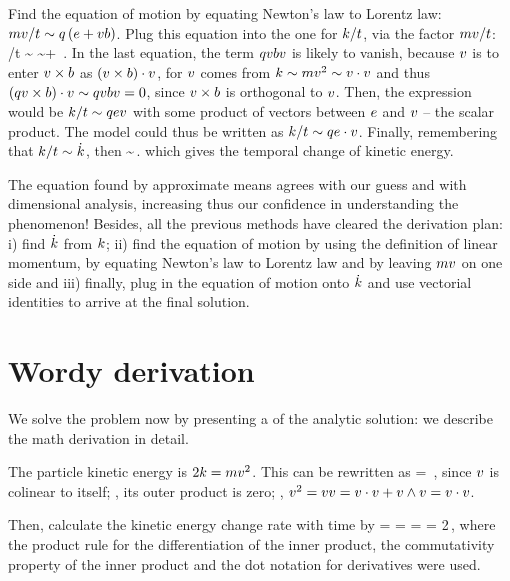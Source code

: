 Find the equation of motion by equating Newton's law to Lorentz law: $mv/t\sim q\left({e + vb}\right)$. Plug this equation into the one for $k/t$, via the factor $mv/t$:
%
\beq
  \ekin/t \sim \echarge\parth{\efield + \vel\mfield}\vel 
          \sim \echarge\efield\vel + \echarge\vel\mfield\vel\,.
\eeq
%
In the last equation, the term $qvbv$ is likely to vanish, because $v$ is to enter $v\times b$ as $\left({v\times b}\right)\cdot v$, for $v$ comes from $k\sim mv^2\sim v\cdot v$ and thus
$\left({qv\times b}\right)\cdot v\sim qvbv = 0$, since $v\times b$ is orthogonal to $v$. Then, the expression would be $k/t\sim qev$ with some product of vectors between $e$ and $v$ -- the scalar product. The model could thus be written as $k/t\sim qe\cdot v$. Finally, remembering that $k/t\sim\dot{k}$, then
%
\beq
  \dt\ekin\sim\echarge\efield\iprod\vel\,.
\eeq
%
which gives the temporal change of kinetic energy.

The equation found by approximate means agrees with our guess and with dimensional analysis, increasing thus our confidence in understanding the phenomenon! Besides, all the previous methods have cleared the derivation plan: i) find $\dot{k}$ from $k$; ii) find the equation of motion by using the definition of linear momentum, by equating Newton's law to Lorentz law and by leaving $mv$ on one side and iii) finally, plug in the equation of motion onto $\dot{k}$ and use vectorial identities to arrive at the final solution.


\section{Wordy derivation}
% 
We solve the problem now by presenting a  of the analytic solution: we describe the math derivation in detail.

The particle kinetic energy is $2k = mv^2$. This can be rewritten as
%
\ekin = \mass\vel\iprod\vel\,,
\eeq
%
since $v$ is colinear to itself; \ie, its outer product is zero; \viz, $v^2 = vv = v\cdot v + v\wedge v = v\cdot v$. 

Then, calculate the kinetic energy change rate with time by
%
\ekin = \mass\vel\iprod\vel {}\dt\ekin = \mass\parth{\dt\vel\iprod\vel + \vel\iprod\dt\vel} 
            = \mass\parth{\dt\vel\iprod\vel + \dt\vel\iprod\vel}
            = 2\mass\dt\vel\iprod\vel\,,
\eeq
%
where the product rule for the differentiation of the inner product, the commutativity property of the inner product and the dot notation for derivatives were used.

